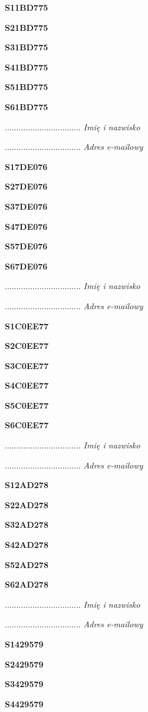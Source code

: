 \Large \textbf{S11BD775}

\Large \textbf{S21BD775}

\Large \textbf{S31BD775}

\Large \textbf{S41BD775}

\Large \textbf{S51BD775}

\Large \textbf{S61BD775}

.................................
\textit{Imię i nazwisko}

.................................
\textit{Adres e-mailowy}

\Large \textbf{S17DE076}

\Large \textbf{S27DE076}

\Large \textbf{S37DE076}

\Large \textbf{S47DE076}

\Large \textbf{S57DE076}

\Large \textbf{S67DE076}

.................................
\textit{Imię i nazwisko}

.................................
\textit{Adres e-mailowy}

\Large \textbf{S1C0EE77}

\Large \textbf{S2C0EE77}

\Large \textbf{S3C0EE77}

\Large \textbf{S4C0EE77}

\Large \textbf{S5C0EE77}

\Large \textbf{S6C0EE77}

.................................
\textit{Imię i nazwisko}

.................................
\textit{Adres e-mailowy}

\Large \textbf{S12AD278}

\Large \textbf{S22AD278}

\Large \textbf{S32AD278}

\Large \textbf{S42AD278}

\Large \textbf{S52AD278}

\Large \textbf{S62AD278}

.................................
\textit{Imię i nazwisko}

.................................
\textit{Adres e-mailowy}

\Large \textbf{S1429579}

\Large \textbf{S2429579}

\Large \textbf{S3429579}

\Large \textbf{S4429579}


